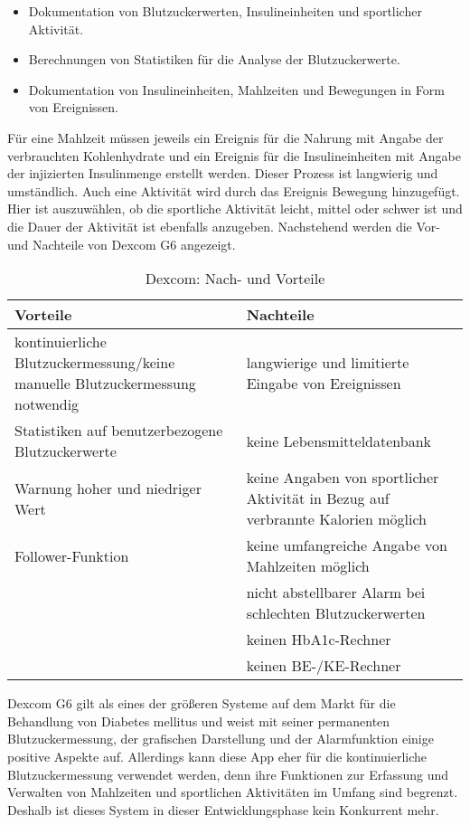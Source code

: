 	\begin{itemize}
		\item Dokumentation von Blutzuckerwerten, Insulineinheiten und sportlicher Aktivität.
		\item Berechnungen von Statistiken für die Analyse der Blutzuckerwerte.
		\item Dokumentation von Insulineinheiten, Mahlzeiten und Bewegungen in Form von Ereignissen.
	\end{itemize}
	Für eine Mahlzeit müssen jeweils ein Ereignis für die Nahrung mit Angabe der verbrauchten Kohlenhydrate und ein Ereignis für die Insulineinheiten mit Angabe der injizierten Insulinmenge erstellt werden. Dieser Prozess ist langwierig und umständlich. Auch eine Aktivität wird durch das Ereignis  \glqq Bewegung\grqq{} hinzugefügt. Hier ist auszuwählen, ob die sportliche Aktivität \glqq leicht\grqq{}, \glqq mittel\grqq{} oder \glqq schwer\grqq{} ist und die Dauer der Aktivität ist ebenfalls anzugeben. \newline
	Nachstehend werden die Vor- und Nachteile von Dexcom G6 angezeigt. \cite{D}
	\begin{table}[H]
		\setlength{\tabcolsep}{12pt}
		\centering
		\begin{tabular}{p{6cm}|p{6cm}}
			\toprule
			\textbf{Vorteile} & \textbf{Nachteile}\\
			\hline
			kontinuierliche Blutzuckermessung/keine manuelle Blutzuckermessung notwendig & langwierige und limitierte Eingabe von Ereignissen\\
			\hline
			Statistiken auf benutzerbezogene Blutzuckerwerte & keine Lebensmitteldatenbank\\
			\hline
			Warnung hoher und niedriger Wert & keine Angaben von sportlicher Aktivität in Bezug auf verbrannte Kalorien möglich\\
			\hline
			Follower-Funktion & keine umfangreiche Angabe von Mahlzeiten möglich\\
			\hline
			 & nicht abstellbarer Alarm bei schlechten Blutzuckerwerten\\
			 \hline
			 & keinen HbA1c-Rechner\\
			 \hline
			 & keinen BE-/KE-Rechner\\
			\bottomrule
		\end{tabular}
		\captionsetup{justification=centering}
		\caption{Dexcom: Nach- und Vorteile}
		\label{tab:Dexcom}
	\end{table}
	\setlength{\parindent}{0pt}Dexcom G6 gilt als eines der größeren Systeme auf dem Markt für die Behandlung von Diabetes mellitus und weist mit seiner permanenten Blutzuckermessung, der grafischen Darstellung und der Alarmfunktion einige positive Aspekte auf. Allerdings kann diese App eher für die kontinuierliche Blutzuckermessung verwendet werden, denn ihre Funktionen zur Erfassung und Verwalten von Mahlzeiten und sportlichen Aktivitäten im Umfang sind begrenzt. Deshalb ist dieses System in dieser Entwicklungsphase kein Konkurrent mehr.\newline
